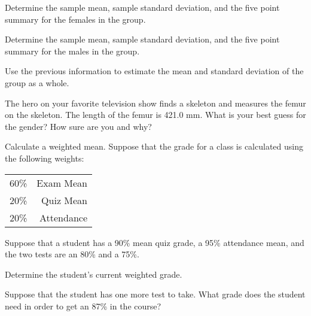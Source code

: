 \begin{problem}
  \begin{subproblem}
  \item Determine the sample mean, sample standard deviation, and the
    five point summary for the females in the group.

    \vfill

  \item Determine the sample mean, sample standard deviation, and the
    five point summary for the males in the group.

    \vfill

  \item Use the previous information to estimate the mean and
    standard deviation of the group as a whole. 

    \vfill

  \item The hero on your favorite television show finds a skeleton and
    measures the femur on the skeleton. The length of the femur is
    421.0 mm. What is your best guess for the gender? How sure are you
    and why?

    \vspace{4em}

  \end{subproblem}

\clearpage

\item Calculate a weighted mean. Suppose that the grade for a class is
  calculated using the following weights: \\
  \begin{tabular}{rr}
    60\% & Exam Mean \\
    20\% & Quiz Mean \\
    20\% & Attendance 
  \end{tabular}

  Suppose that a student has a 90\% mean quiz grade, a 95\% attendance
  mean, and the two tests are an 80\% and a 75\%. 

  \begin{subproblem}
  \item Determine the student's current weighted grade.

    \vfill

  \item Suppose that the student has one more test to take. What grade
    does the student need in order to get an 87\% in the course?

    \vfill

  \end{subproblem}


\end{problem}

